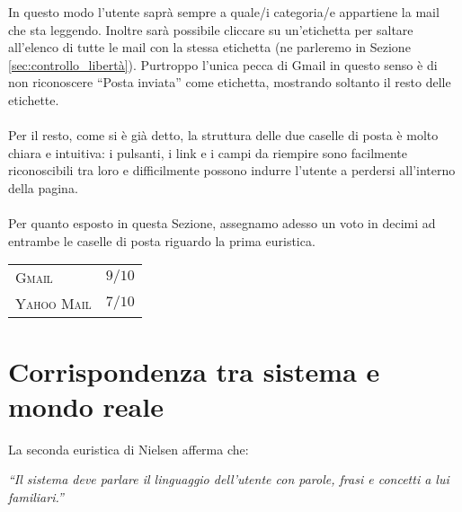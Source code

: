 		In questo modo l'utente saprà sempre a quale/i categoria/e appartiene la mail che sta leggendo. Inoltre sarà possibile cliccare su un'etichetta per saltare all'elenco di tutte le mail con la stessa etichetta (ne parleremo in Sezione \ref{sec:controllo_libertà}). Purtroppo l'unica pecca di Gmail in questo senso è di non riconoscere ``Posta inviata'' come etichetta, mostrando soltanto il resto delle etichette.\\
		\\
		Per il resto, come si è già detto, la struttura delle due caselle di posta è molto chiara e intuitiva: i pulsanti, i link e i campi da riempire sono facilmente riconoscibili tra loro e difficilmente possono indurre l'utente a perdersi all'interno della pagina.\\
		\\
		Per quanto esposto in questa Sezione, assegnamo adesso un voto in decimi ad entrambe le caselle di posta riguardo la prima euristica.
		
		\begin{flushleft}
			\begin{tabular}{lr}
				\textsc{Gmail} & $9/10$\\
				\textsc{Yahoo Mail} & $7/10$
			\end{tabular}
		\end{flushleft}
	
	\section{Corrispondenza tra sistema e mondo reale} \label{sec:corrispondenza_sistema_mondo_reale}
	
		La seconda euristica di Nielsen afferma che:
		\begin{center}
			\begin{minipage}{0.7\textwidth}
				\textit{``Il sistema deve parlare il linguaggio dell'utente con parole, frasi e concetti a lui familiari.''}
			\end{minipage}
		\end{center}
		
